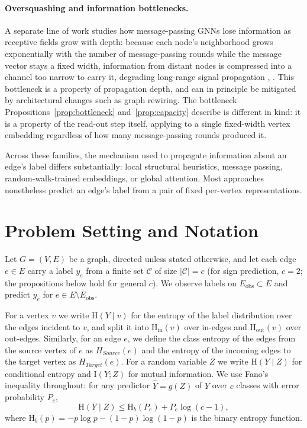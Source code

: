 \documentclass[letterpaper]{article} %
\newcommand{\Hh}{\mathrm{H}}
\newcommand{\MI}{\mathrm{I}}
\newcommand{\indeg}{\mathrm{in}}
\newcommand{\outdeg}{\mathrm{out}}
\theoremstyle{plain}
\theoremstyle{definition}
\begin{document}
\paragraph{Oversquashing and information bottlenecks.} A separate line of work studies how message-passing GNNs lose information as receptive fields grow with depth: because each node's neighborhood grows exponentially with the number of message-passing rounds while the message vector stays a fixed width, information from distant nodes is compressed into a channel too narrow to carry it, degrading long-range signal propagation \citep{PLACEHOLDER: Alon & Yahav 2021}, \citep{PLACEHOLDER: Topping et al. 2022}. This bottleneck is a property of propagation depth, and can in principle be mitigated by architectural changes such as graph rewiring. The bottleneck Propositions~\ref{prop:bottleneck} and~\ref{prop:capacity} describe is different in kind: it is a property of the read-out step itself, applying to a single fixed-width vertex embedding regardless of how many message-passing rounds produced it.

Across these families, the mechanism used to propagate information about an edge's label differs substantially: local structural heuristics, message passing, random-walk-trained embeddings, or global attention. Most approaches nonetheless predict an edge's label from a pair of fixed per-vertex representations.

\section{Problem Setting and Notation}
Let $G=(V,E)$ be a graph, directed unless stated otherwise, and let each edge $e\in E$ carry a label $y_e$ from a finite set $\mathcal{C}$ of size $|\mathcal{C}|=c$ (for sign prediction, $c=2$; the propositions below hold for general $c$). We observe labels on $E_{\mathrm{obs}}\subset E$ and predict $y_e$ for $e\in E\setminus E_{\mathrm{obs}}$.

For a vertex $v$ we write $\Hh(Y\mid v)$ for the entropy of the label distribution over the edges incident to $v$, and split it into $\Hh_\indeg(v)$ over in-edges and $\Hh_\outdeg(v)$ over out-edges.  Similarly, for an edge $e$, we define the class entropy of the edges from the source vertex of $e$ as $H_{Source}(e)$ and the entropy of the incoming edges to the target vertex as $H_{Target}(e)$. For a random variable $Z$ we write $\Hh(Y\mid Z)$ for conditional entropy and $\MI(Y;Z)$ for mutual information. We use Fano's inequality throughout: for any predictor $\hat Y=g(Z)$ of $Y$ over $c$ classes with error probability $P_e$,
\begin{equation}
\Hh(Y\mid Z)\le \Hh_b(P_e)+P_e\log(c-1),
\label{eq:fano}
\end{equation}
where $\Hh_b(p)=-p\log p-(1-p)\log(1-p)$ is the binary entropy function.
\end{document}
